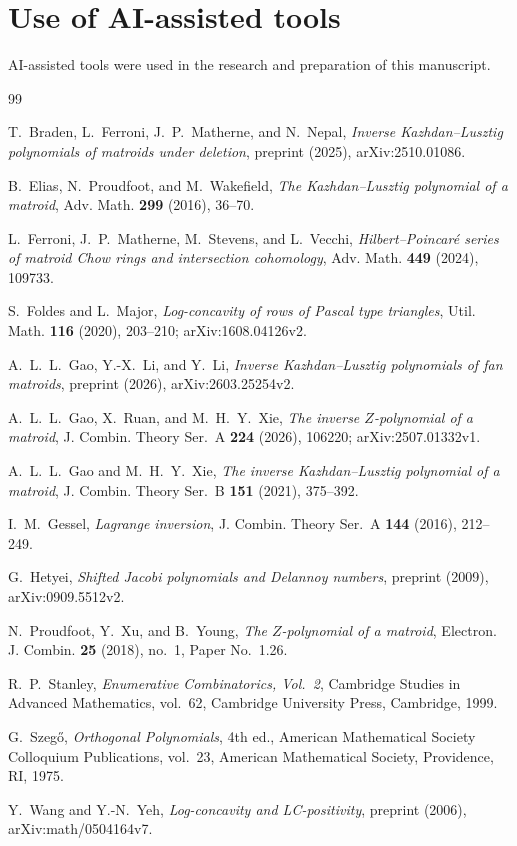 \documentclass{amsart}
\theoremstyle{definition}
\theoremstyle{remark}
\numberwithin{equation}{section}
\numberwithin{table}{section}
\begin{document}
\section*{Use of AI-assisted tools}

AI-assisted tools were used in the research and preparation of this manuscript.

\begin{thebibliography}{99}

T.~Braden, L.~Ferroni, J.~P.~Matherne, and N.~Nepal, \emph{Inverse Kazhdan--Lusztig polynomials of matroids under deletion}, preprint (2025), arXiv:2510.01086.

B.~Elias, N.~Proudfoot, and M.~Wakefield, \emph{The Kazhdan--Lusztig polynomial of a matroid}, Adv. Math. \textbf{299} (2016), 36--70.

L.~Ferroni, J.~P.~Matherne, M.~Stevens, and L.~Vecchi, \emph{Hilbert--Poincar\'e series of matroid Chow rings and intersection cohomology}, Adv. Math. \textbf{449} (2024), 109733.

S.~Foldes and L.~Major, \emph{Log-concavity of rows of Pascal type triangles}, Util. Math. \textbf{116} (2020), 203--210; arXiv:1608.04126v2.

A.~L.~L.~Gao, Y.-X.~Li, and Y.~Li, \emph{Inverse Kazhdan--Lusztig polynomials of fan matroids}, preprint (2026), arXiv:2603.25254v2.

A.~L.~L.~Gao, X.~Ruan, and M.~H.~Y.~Xie, \emph{The inverse $Z$-polynomial of a matroid}, J. Combin. Theory Ser.~A \textbf{224} (2026), 106220; arXiv:2507.01332v1.

A.~L.~L.~Gao and M.~H.~Y.~Xie, \emph{The inverse Kazhdan--Lusztig polynomial of a matroid}, J. Combin. Theory Ser.~B \textbf{151} (2021), 375--392.

I.~M.~Gessel, \emph{Lagrange inversion}, J. Combin. Theory Ser.~A \textbf{144} (2016), 212--249.

G.~Hetyei, \emph{Shifted Jacobi polynomials and Delannoy numbers}, preprint (2009), arXiv:0909.5512v2.

N.~Proudfoot, Y.~Xu, and B.~Young, \emph{The $Z$-polynomial of a matroid}, Electron. J. Combin. \textbf{25} (2018), no.~1, Paper No.~1.26.

R.~P.~Stanley, \emph{Enumerative Combinatorics, Vol.~2}, Cambridge Studies in Advanced Mathematics, vol.~62, Cambridge University Press, Cambridge, 1999.

G.~Szeg\H{o}, \emph{Orthogonal Polynomials}, 4th ed., American Mathematical Society Colloquium Publications, vol.~23, American Mathematical Society, Providence, RI, 1975.

Y.~Wang and Y.-N.~Yeh, \emph{Log-concavity and LC-positivity}, preprint (2006), arXiv:math/0504164v7.

\end{thebibliography}
\end{document}
